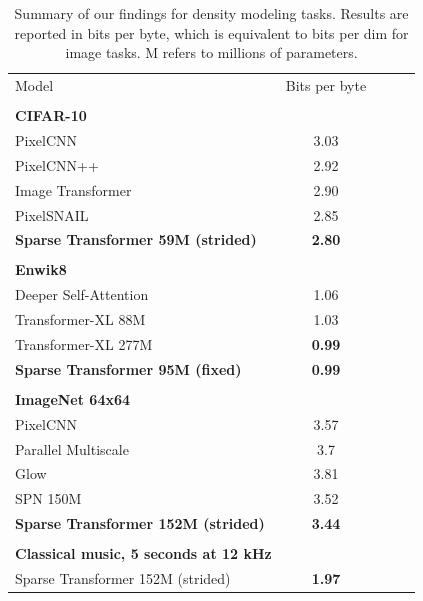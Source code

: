 \documentclass{article}
\begin{document}
\begin{table}[t]
\caption{Summary of our findings for density modeling tasks. Results are reported in bits per byte, which is equivalent to bits per dim for image tasks. M refers to millions of parameters.}
\label{all_results}
\vskip 0.15in
\begin{center}
\begin{small}
\begin{tabular}{lcccr}
\toprule
Model & Bits per byte\\
\quad \\

\textbf{CIFAR-10}\\
\midrule
PixelCNN \cite{oord2016pixel} & 3.03\\
PixelCNN++ \cite{salimans2017pixelcnn++} & 2.92\\
Image Transformer \cite{parmar2018image} & 2.90\\
PixelSNAIL \cite{chen2017pixelsnail} & 2.85\\
\textbf{Sparse Transformer 59M (strided)} & \textbf{2.80} \\

\quad \\
\textbf{Enwik8}\\
\midrule
Deeper Self-Attention \cite{al2018character} & 1.06\\
Transformer-XL 88M \cite{dai2018transformer} & 1.03 \\
Transformer-XL 277M \cite{dai2018transformer} & \textbf{0.99}\\
\textbf{Sparse Transformer 95M (fixed)} & \textbf{0.99}\\

\quad \\
\textbf{ImageNet 64x64}\\
\midrule
PixelCNN \cite{oord2016pixel} & 3.57 \\
Parallel Multiscale \cite{reed2017parallel} & 3.7 \\
Glow \cite{kingma2018glow} & 3.81 \\
SPN 150M \cite{menick2018generating} & 3.52 \\
\textbf{Sparse Transformer 152M (strided)} & \textbf{3.44} \\


\quad \\
\textbf{Classical music, 5 seconds at 12 kHz} \\
\midrule
Sparse Transformer 152M (strided) & \textbf{1.97} \\

\bottomrule
\end{tabular}
\end{small}
\end{center}
\vskip -0.1in
\end{table}
\end{document}
